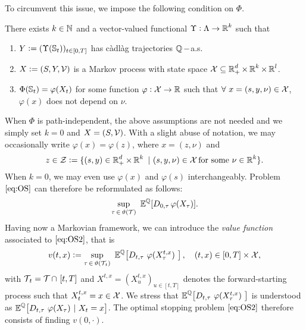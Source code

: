 To circumvent this issue, we impose the following condition on $\Phi$. 
\begin{asm}\label{asm:enlargement}
There exists $k\in \operatorname{\mathbb{N}}$ and a vector-valued functional $\Upsilon: \Lambda \to \operatorname{\mathbb{R}}^k$ such that
\begin{enumerate}
\item $Y := (\Upsilon(\operatorname{\mathbb{S}}_t))_{t\in [0,T]}$ has c\`adl\`ag trajectories $\operatorname{\mathbb{Q}}-$a.s. 
    \item $X := (S,Y,\operatorname{\mathcal{V}})$ is a Markov process with state space $\operatorname{\mathcal{X}} \subseteq  \operatorname{\mathbb{R}}^d_+ \times \operatorname{\mathbb{R}}^{k} \times \operatorname{\mathbb{R}}^{l}$.
    \item  $\Phi(\operatorname{\mathbb{S}}_t) = \varphi(X_t)$ for some function $\varphi:\operatorname{\mathcal{X}} \to \operatorname{\mathbb{R}}$ such that  $ \forall \ x=(s,y,\nu) \in \operatorname{\mathcal{X}}$,  $\varphi(x)$ does not depend on $\nu$.
\end{enumerate}
\end{asm}

When $\Phi$ is path-independent, the above assumptions are not needed and we simply set $k=0$ and $X=(S,\operatorname{\mathcal{V}})$. With a slight abuse of notation, we may occasionally write $\varphi(x)=\varphi(z)$, where $x=(z,\nu)$ and  
\begin{equation} \label{eq:Z}
    z\in \operatorname{\mathcal{Z}} := \{(s,y) \in \operatorname{\mathbb{R}}_+^d \times \operatorname{\mathbb{R}}^k \ | \ (s,y,\nu) \in \operatorname{\mathcal{X}} \text{for some } \nu \in \operatorname{\mathbb{R}}^k\}.
\end{equation} 
When $k=0$, we  may even use $\varphi(x)$ and $\varphi(s)$ interchangeably.   
Problem $\eqref{eq:OS}$ can therefore be reformulated as follows:
\begin{equation}\label{eq:OS2}
\underset{\tau \, \in \, \vartheta(\calT)}{\text{sup}} \ \E^{\Q}[D_{0,\tau}\, \varphi(X_{\tau})].
\end{equation} 
Having now a Markovian framework, we can introduce the \textit{value function} associated to $\eqref{eq:OS2}$, that is
\begin{equation} \label{eq:valueFct}
v(t,x):= \underset{\tau \, \in\,  \vartheta(\operatorname{\mathcal{T}}_{\!t})}{\text{sup}} \
\operatorname{\mathbb{E}}^{\operatorname{\mathbb{Q}}}\! \left[ D_{t,\tau}\ \varphi(X^{t,x}_\tau)\ \right],\quad (t,x)\in [0,T]\times \operatorname{\mathcal{X}},
\end{equation} 
with $\operatorname{\mathcal{T}}_{\!t} = \operatorname{\mathcal{T}} \cap \ [t,T]$ and $X^{t,x} = (X_u^{t,x})_{u\in [t,T]}$ denotes the forward-starting process such that $X^{t,x}_t= x \in \operatorname{\mathcal{X}}$.  We stress that  $\E^{\Q}\! \left[ D_{t,\tau}\ \varphi(X^{t,x}_\tau)\ \right]$ is understood as $\E^{\Q}\! \left[ D_{t,\tau}\ \varphi(X_\tau)\ | \ X_t= x\right]$. 
The optimal stopping problem  $\eqref{eq:OS2}$ therefore consists of finding $v(0,\cdot)$.

